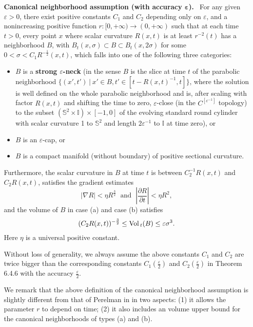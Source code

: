\medskip
{\bf Canonical neighborhood assumption (with accuracy $\boldsymbol
\varepsilon$).} \ For any given $\varepsilon >0$, there
exist positive constants $C_1$ and $C_2$ depending only on
$\varepsilon$, and a nonincreasing positive function $r:
[0,+\infty) \rightarrow (0,+\infty)$ such that at each time $t>0$,
every point $x$ where scalar curvature $R(x,t)$ is at least
$r^{-2}(t)$ has a neighborhood $B$, with $B_t(x,\sigma)\subset B
\subset B_t(x,2\sigma)$ for some $ 0<\sigma <
C_1R^{-\frac{1}{2}}(x,t)$, which falls into one of the following
three categories:
\begin{itemize}
\item[(a)] $B$ is a \textbf{strong
$\varepsilon$-neck} (in the sense
$B$ is the slice at time $t$ of the parabolic neighborhood
$\{(x',t')\ |\ x'\in B, t'\in[t-R(x,t)^{-1},t]\}$, where the
solution is well defined on the whole parabolic neighborhood and
is, after scaling with factor $R(x,t)$ and shifting the time to
zero, $\varepsilon$-close (in the $C^{[\varepsilon^{-1}]}$
topology) to the subset $(\mathbb{S}^2 \times \mathbb{I}) \times
[-1,0]$ of the evolving standard round cylinder with scalar
curvature 1 to $\mathbb{S}^2$ and length $2\varepsilon^{-1}$ to
$\mathbb{I}$ at time zero), or \item[(b)] $B$ is an
$\varepsilon$-cap, or \item[(c)] $B$ is a compact manifold
(without boundary) of positive sectional curvature.
\end{itemize}
Furthermore, the scalar curvature in $B$ at time $t$ is between
$C^{-1}_2R(x,t)$ and $C_2R(x,t)$, satisfies the gradient estimates
\begin{equation} |\nabla R|<\eta R^{\frac{3}{2}}\;  \mbox{ and }\;
\left|\frac{\partial R}{\partial t}\right|<\eta R^2, %
\end{equation} and the volume of $B$ in case (a) and case (b) satisfies
$$
(C_2R(x,t))^{-\frac{3}{2}} \leq {\rm Vol}\,_t(B) \leq \varepsilon
\sigma^3.
$$
Here $\eta$ is a universal positive constant.

\medskip
Without loss of generality, we always assume the above constants
$C_1$ and $C_2$ are twice bigger than the corresponding constants
$C_1(\frac{\varepsilon}{2})$ and $C_2(\frac{\varepsilon}{2})$ in
Theorem 6.4.6 with the accuracy $\frac{\varepsilon}{2}$.

We remark that the above definition of the canonical neighborhood
assumption is slightly different from that of Perelman in
\cite{P2} in two aspects: (1) it allows the parameter $r$ to
depend on time; (2) it also includes an volume upper bound for the
canonical neighborhoods of types (a) and (b).

